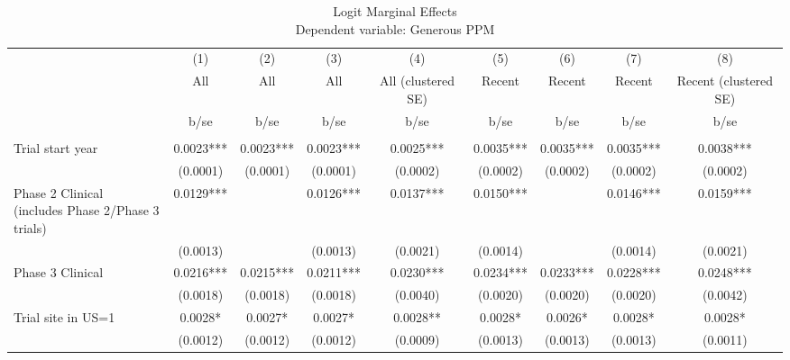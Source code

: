 
\begin{table}[htb]\centering
\caption{Logit Marginal Effects\\Dependent variable: Generous PPM}
\begin{tabular}{l*{8}c}

 & (1) & (2) & (3) & (4) & (5) & (6) & (7) & (8)  \\
 & All & All & All & All (clustered SE) & Recent & Recent & Recent & Recent (clustered SE)  \\

                    &        b/se   &        b/se   &        b/se   &        b/se   &        b/se   &        b/se   &        b/se   &        b/se   \\

\hline

       &               &               &               &               &               &               &               &               \\
Trial start year    &      0.0023***&      0.0023***&      0.0023***&      0.0025***&      0.0035***&      0.0035***&      0.0035***&      0.0038***\\
                    &    (0.0001)   &    (0.0001)   &    (0.0001)   &    (0.0002)   &    (0.0002)   &    (0.0002)   &    (0.0002)   &    (0.0002)   \\
\shortstack[l]{Phase 2 Clinical\\(includes Phase 2/Phase 3 trials)}&      0.0129***&               &      0.0126***&      0.0137***&      0.0150***&               &      0.0146***&      0.0159***\\
                    &    (0.0013)   &               &    (0.0013)   &    (0.0021)   &    (0.0014)   &               &    (0.0014)   &    (0.0021)   \\
Phase 3 Clinical    &      0.0216***&      0.0215***&      0.0211***&      0.0230***&      0.0234***&      0.0233***&      0.0228***&      0.0248***\\
                    &    (0.0018)   &    (0.0018)   &    (0.0018)   &    (0.0040)   &    (0.0020)   &    (0.0020)   &    (0.0020)   &    (0.0042)   \\
Trial site in US=1  &      0.0028*  &      0.0027*  &      0.0027*  &      0.0028** &      0.0028*  &      0.0026*  &      0.0028*  &      0.0028*  \\
                    &    (0.0012)   &    (0.0012)   &    (0.0012)   &    (0.0009)   &    (0.0013)   &    (0.0013)   &    (0.0013)   &    (0.0011)   \\

\end{tabular}
\end{table}
